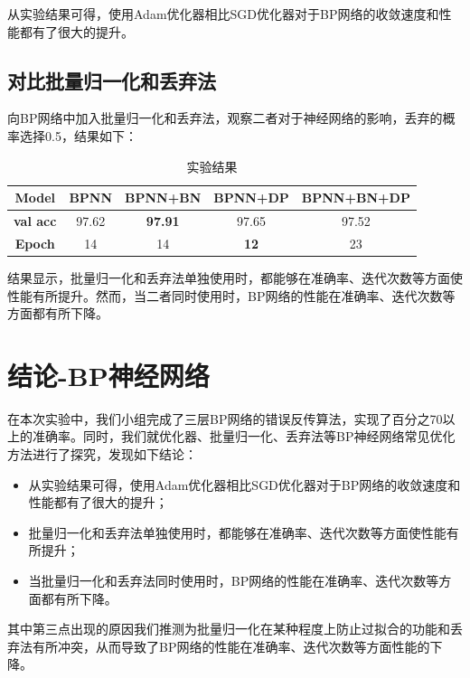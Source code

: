 \documentclass[withoutpreface,bwprint]{cumcmthesis} %
\begin{document}
   从实验结果可得，使用Adam优化器相比SGD优化器对于BP网络的收敛速度和性能都有了很大的提升。


\subsection{对比批量归一化和丢弃法}

向BP网络中加入批量归一化和丢弃法，观察二者对于神经网络的影响，丢弃的概率选择0.5，结果如下：
\begin{table}[H]
\centering
\caption{实验结果}
\begin{tabular}{|c|c|c|c|c|}
\hline
\textbf{Model}   & \textbf{BPNN} & \textbf{BPNN+BN} & \textbf{BPNN+DP}     & \textbf{BPNN+BN+DP} \\ \hline
\textbf{val acc} & 97.62         & \textbf{97.91}   & 97.65       & 97.52      \\ \hline
\textbf{Epoch}   & 14            & 14               & \textbf{12} & 23         \\ \hline
\end{tabular}
\end{table}
结果显示，批量归一化和丢弃法单独使用时，都能够在准确率、迭代次数等方面使性能有所提升。然而，当二者同时使用时，BP网络的性能在准确率、迭代次数等方面都有所下降。
   
   
   
\section{结论-BP神经网络}
	在本次实验中，我们小组完成了三层BP网络的错误反传算法，实现了百分之70以上的准确率。同时，我们就优化器、批量归一化、丢弃法等BP神经网络常见优化方法进行了探究，发现如下结论：
	\begin{itemize}
	\item    从实验结果可得，使用Adam优化器相比SGD优化器对于BP网络的收敛速度和性能都有了很大的提升；
	\item 批量归一化和丢弃法单独使用时，都能够在准确率、迭代次数等方面使性能有所提升；
	\item 当批量归一化和丢弃法同时使用时，BP网络的性能在准确率、迭代次数等方面都有所下降。
	\end{itemize}
	其中第三点出现的原因我们推测为批量归一化在某种程度上防止过拟合的功能\cite{3}和丢弃法有所冲突，从而导致了BP网络的性能在准确率、迭代次数等方面性能的下降。
\end{document}
